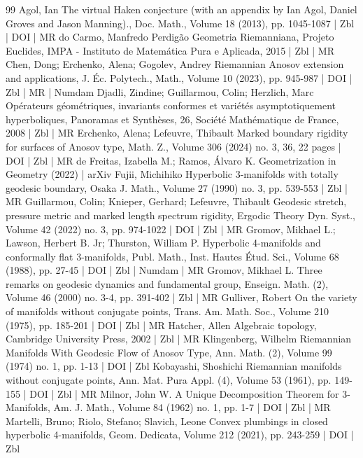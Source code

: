 \documentclass[10pt]{amsart}
\theoremstyle{definition}\newtheorem{defi}[theo]{Definition}\newtheorem{rema}[theo]{Remark}\newtheorem{exam}[theo]{Example}\newtheorem{exem}[theo]{Example}\newtheorem{nota}[theo]{Notation}
\theoremstyle{plain}
\begin{document}
\begin{thebibliography}{99}
Agol, Ian The virtual Haken conjecture (with an appendix by Ian Agol, Daniel Groves and Jason Manning)., Doc. Math., Volume 18 (2013), pp. 1045-1087 | Zbl | DOI | MR
do Carmo, Manfredo Perdigão Geometria Riemanniana, Projeto Euclides, IMPA - Instituto de Matemática Pura e Aplicada, 2015 | Zbl | MR
Chen, Dong; Erchenko, Alena; Gogolev, Andrey Riemannian Anosov extension and applications, J. Éc. Polytech., Math., Volume 10 (2023), pp. 945-987 | DOI | Zbl | MR | Numdam
Djadli, Zindine; Guillarmou, Colin; Herzlich, Marc Opérateurs géométriques, invariants conformes et variétés asymptotiquement hyperboliques, Panoramas et Synthèses, 26, Société Mathématique de France, 2008 | Zbl | MR
Erchenko, Alena; Lefeuvre, Thibault Marked boundary rigidity for surfaces of Anosov type, Math. Z., Volume 306 (2024) no. 3, 36, 22 pages | DOI | Zbl | MR
de Freitas, Izabella M.; Ramos, Álvaro K. Geometrization in Geometry (2022) | arXiv
Fujii, Michihiko Hyperbolic 3-manifolds with totally geodesic boundary, Osaka J. Math., Volume 27 (1990) no. 3, pp. 539-553 | Zbl | MR
Guillarmou, Colin; Knieper, Gerhard; Lefeuvre, Thibault Geodesic stretch, pressure metric and marked length spectrum rigidity, Ergodic Theory Dyn. Syst., Volume 42 (2022) no. 3, pp. 974-1022 | DOI | Zbl | MR
Gromov, Mikhael L.; Lawson, Herbert B. Jr; Thurston, William P. Hyperbolic 4-manifolds and conformally flat 3-manifolds, Publ. Math., Inst. Hautes Étud. Sci., Volume 68 (1988), pp. 27-45 | DOI | Zbl | Numdam | MR
Gromov, Mikhael L. Three remarks on geodesic dynamics and fundamental group, Enseign. Math. (2), Volume 46 (2000) no. 3-4, pp. 391-402 | Zbl | MR
Gulliver, Robert On the variety of manifolds without conjugate points, Trans. Am. Math. Soc., Volume 210 (1975), pp. 185-201 | DOI | Zbl | MR
Hatcher, Allen Algebraic topology, Cambridge University Press, 2002 | Zbl | MR
Klingenberg, Wilhelm Riemannian Manifolds With Geodesic Flow of Anosov Type, Ann. Math. (2), Volume 99 (1974) no. 1, pp. 1-13 | DOI | Zbl
Kobayashi, Shoshichi Riemannian manifolds without conjugate points, Ann. Mat. Pura Appl. (4), Volume 53 (1961), pp. 149-155 | DOI | Zbl | MR
Milnor, John W. A Unique Decomposition Theorem for 3-Manifolds, Am. J. Math., Volume 84 (1962) no. 1, pp. 1-7 | DOI | Zbl | MR
Martelli, Bruno; Riolo, Stefano; Slavich, Leone Convex plumbings in closed hyperbolic 4-manifolds, Geom. Dedicata, Volume 212 (2021), pp. 243-259 | DOI | Zbl
\end{thebibliography}
\end{document}
